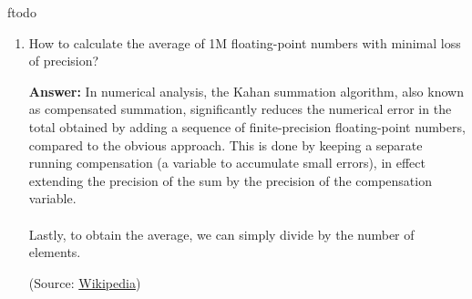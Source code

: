 ƒtodo\documentclass{article}
\newenvironment{QandA}{\begin{enumerate}[label=\arabic*.]}{\end{enumerate}}
\newenvironment{answer}{\par\normalfont \textbf{Answer:}}{}
\begin{document}
\begin{QandA}
\begin{answer}
\begin{enumerate}[label=\arabic*.]
\begin{enumerate}
                \item Cast gradients to FP32.
                \item Multiply the weight gradient with 1/S.
                \item Complete the weight update to the FP32 copy.
            \end{enumerate}     
        \end{enumerate}        
        Since all activations are stored in half-precision, we still end up with net reduction in memory, even though we keep 2 copies of the network (single- and half- precision).

        (Source: \href{https://docs.nvidia.com/deeplearning/performance/mixed-precision-training/index.html}{Nvidia})
    \end{answer}

    \item How to calculate the average of 1M floating-point numbers with minimal loss of precision?
    \begin{answer}
        In numerical analysis, the Kahan summation algorithm, also known as compensated summation, significantly reduces the numerical error in the total obtained by adding a sequence of finite-precision floating-point numbers, compared to the obvious approach. This is done by keeping a separate running compensation (a variable to accumulate small errors), in effect extending the precision of the sum by the precision of the compensation variable. \\\\
        Lastly, to obtain the average, we can simply divide by the number of elements. 

        (Source: \href{https://en.wikipedia.org/wiki/Kahan_summation_algorithm}{Wikipedia})
    \end{answer}


\end{QandA}
\end{document}
